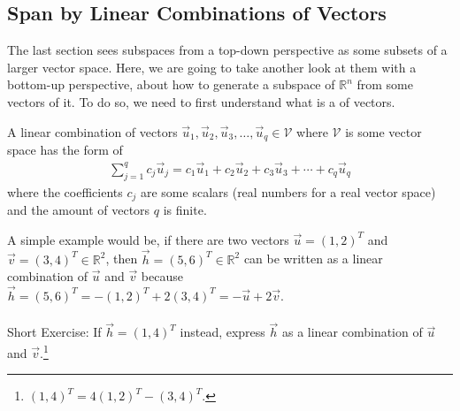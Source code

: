 \subsection{Span by Linear Combinations of Vectors}
\label{section:span}
The last section sees subspaces from a top-down perspective as some subsets of a larger vector space. Here, we are going to take another look at them with a bottom-up perspective, about how to generate a subspace of $\mathbb{R}^n$ from some vectors of it. To do so, we need to first understand what is a  of vectors.
\begin{defn}
\label{defn:linearcomb}
A linear combination of vectors $\vec{u}_1, \vec{u}_2, \vec{u}_3, \ldots, \vec{u}_q \in \mathcal{V}$ where $\mathcal{V}$ is some vector space has the form of
\begin{align*}
\sum_{j=1}^q c_j\vec{u}_j = c_1\vec{u}_1 + c_2\vec{u}_2 + c_3\vec{u}_3 + \cdots + c_q\vec{u}_q
\end{align*}
where the coefficients $c_j$ are some scalars (real numbers for a real vector space) and the amount of vectors $q$ is finite.
\end{defn}
A simple example would be, if there are two vectors $\vec{u} = (1,2)^T$ and $\vec{v} = (3,4)^T \in \mathbb{R}^2$, then $\vec{h} = (5,6)^T \in \mathbb{R}^2$ can be written as a linear combination of $\vec{u}$ and $\vec{v}$ because $\vec{h} = (5,6)^T = -(1,2)^T + 2(3,4)^T = -\vec{u} + 2\vec{v}$. \\
\\
Short Exercise: If $\vec{h} = (1,4)^T$ instead, express $\vec{h}$ as a linear combination of $\vec{u}$ and $\vec{v}$.\footnote{$(1,4)^T = 4(1,2)^T - (3,4)^T$.}\par

